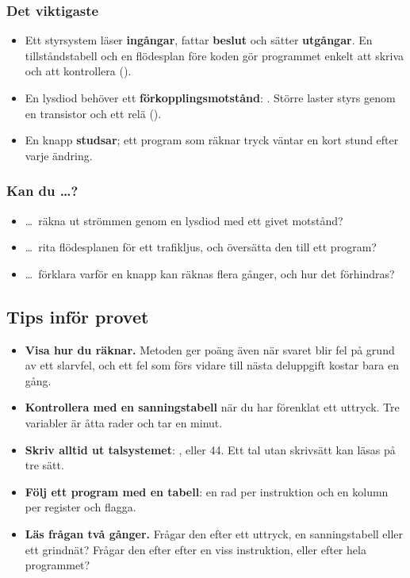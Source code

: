 \subsubsection{Det viktigaste}
\begin{itemize}
  \item Ett styrsystem läser \textbf{ingångar}, fattar \textbf{beslut} och sätter
    \textbf{utgångar}. En tillståndstabell och en flödesplan före koden gör programmet enkelt att
    skriva och att kontrollera ().
  \item En lysdiod behöver ett \textbf{förkopplingsmotstånd}: .
    Större laster styrs genom en transistor och ett relä ().
  \item En knapp \textbf{studsar}; ett program som räknar tryck väntar en kort stund efter varje
    ändring.
\end{itemize}

\subsubsection{Kan du \dots?}
\begin{itemize}
  \item \dots\ räkna ut strömmen genom en lysdiod med ett givet motstånd?
  \item \dots\ rita flödesplanen för ett trafikljus, och översätta den till ett program?
  \item \dots\ förklara varför en knapp kan räknas flera gånger, och hur det förhindras?
\end{itemize}

\subsection{Tips inför provet}
\label{c12:a8}
\begin{itemize}
  \item \textbf{Visa hur du räknar.} Metoden ger poäng även när svaret blir fel på grund av ett
    slarvfel, och ett fel som förs vidare till nästa deluppgift kostar bara en gång.
  \item \textbf{Kontrollera med en sanningstabell} när du har förenklat ett uttryck. Tre variabler
    är åtta rader och tar en minut.
  \item \textbf{Skriv alltid ut talsystemet}: ,  eller 44. Ett tal utan
    skrivsätt kan läsas på tre sätt.
  \item \textbf{Följ ett program med en tabell}: en rad per instruktion och en kolumn per register
    och flagga.
  \item \textbf{Läs frågan två gånger.} Frågar den efter ett uttryck, en sanningstabell eller ett
    grindnät? Frågar den efter  efter en viss instruktion, eller efter hela programmet?
\end{itemize}
